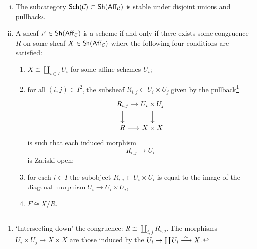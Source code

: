         \begin{lemma}\label{le:actual-gluing}
            \mbox{}\vspace{-1em}
            \begin{enumerate}[(i)]
                \item The subcategory $\mathsf{Sch}(\mathcal{C})\subset\mathsf{Sh}(\mathsf{Aff}_{\mathcal{C}})$ is stable under disjoint unions and pullbacks.
                \item A sheaf $F\in\mathsf{Sh}(\mathsf{Aff}_{\mathcal{C}})$ is a scheme if and only if there exists some congruence $R$ on some sheaf $X\in\mathsf{Sh}(\mathsf{Aff}_{\mathcal{C}})$ where the following four conditions are satisfied:
                \begin{enumerate}
                    \item $X\cong\coprod_{i\in I}U_i$ for some affine schemes $U_i$;
                    \item for all $(i,j)\in I^2$, the subsheaf $R_{i,j}\subset U_i\times U_j$ given by the pullback\footnote{
                        `Intersecting down' the congruence: $R\cong\coprod_{i,j}R_{i,j}$.
                        The morphisms $U_i\times U_j\to X\times X$ are those induced by the $U_i\to\coprod U_i\overset{\sim}{\longrightarrow} X$.
                    }
                        \begin{equation*}
                            \begin{tikzcd}[column sep=1em]
                                R_{i,j} \arrow[r] \arrow[d] & U_i\times U_j \arrow[d]\\
                                R \arrow[r] & X\times X
                            \end{tikzcd}
                        \end{equation*}
                        is such that each induced morphism
                        \begin{equation*}
                            R_{i,j}\to U_i
                        \end{equation*}
                        is Zariski open;
                    \item for each $i\in I$ the subobject $R_{i,i}\subset U_i\times U_i$ is equal to the image of the diagonal morphism $U_i\to U_i\times U_i$;
                    \item $F\cong X/R$.\qedhere
                \end{enumerate}
            \end{enumerate}
        \end{lemma}

